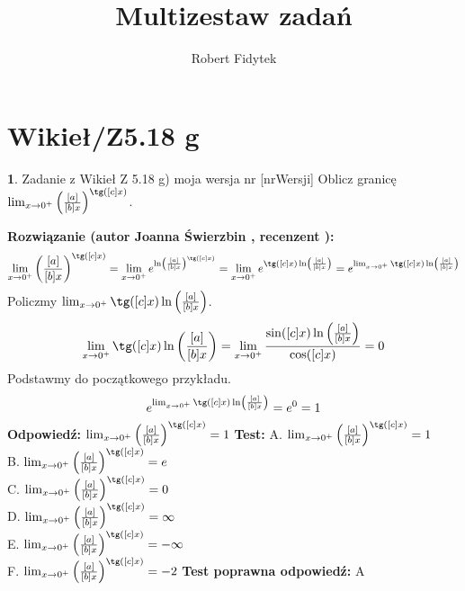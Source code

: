 \documentclass[12pt, a4paper]{article}
\title{Multizestaw zadań}
\author{Robert Fidytek}
\date{}
\theoremstyle{definition} %
\newtheorem{zad}{}
\newcommand{\kategoria}[1]{\section{#1}} %
\newcommand{\zadStart}[1]{\begin{zad}#1\newline} %
\newcommand{\zadStop}{\end{zad}}   %
\newcommand{\rozwStart}[2]{\noindent \textbf{Rozwiązanie (autor #1 , recenzent #2): }\newline} %
\newcommand{\rozwStop}{\newline}                                            %
\newcommand{\odpStart}{\noindent \textbf{Odpowiedź:}\newline}    %
\newcommand{\odpStop}{\newline}                                             %
\newcommand{\testStart}{\noindent \textbf{Test:}\newline} %
\newcommand{\testStop}{\newline} %
\newcommand{\kluczStart}{\noindent \textbf{Test poprawna odpowiedź:}\newline} %
\newcommand{\kluczStop}{\newline} %
\begin{document}
\maketitle


\kategoria{Wikieł/Z5.18 g}
\zadStart{Zadanie z Wikieł Z 5.18 g) moja wersja nr [nrWersji]}
Oblicz granicę $\lim_{x \rightarrow 0^+} \left( \frac{[a]}{[b]x}\right)^{\tg([c]x)}$.
\zadStop
\rozwStart{Joanna Świerzbin}{}
$$ \lim_{x \rightarrow 0^+} \left( \frac{[a]}{[b]x}\right)^{\tg([c]x)} = \lim_{x \rightarrow 0^+} e^{\ln \left( \frac{[a]}{[b]x}\right)^{\tg([c]x)}}
= \lim_{x \rightarrow 0^+} e^{{\tg([c]x)} \ln \left( \frac{[a]}{[b]x}\right)}= e^{ \lim_{x \rightarrow 0^+}{\tg([c]x)} \ln \left( \frac{[a]}{[b]x}\right)}$$
Policzmy ${ \lim_{x \rightarrow 0^+}{\tg([c]x)} \ln \left( \frac{[a]}{[b]x}\right)}$.
$${ \lim_{x \rightarrow 0^+}{\tg([c]x)} \ln \left( \frac{[a]}{[b]x}\right)} = { \lim_{x \rightarrow 0^+}\frac{\sin([c]x) \ln \left( \frac{[a]}{[b]x}\right)}{\cos([c]x)}} = 0$$
Podstawmy do początkowego przykładu.
$$e^{ \lim_{x \rightarrow 0^+}{\tg([c]x)} \ln \left( \frac{[a]}{[b]x}\right)} = e^0 = 1$$
\rozwStop
\odpStart
$\lim_{x \rightarrow 0^+} \left( \frac{[a]}{[b]x}\right)^{\tg([c]x)} = 1$
\odpStop
\testStart
A. $\lim_{x \rightarrow 0^+} \left( \frac{[a]}{[b]x}\right)^{\tg([c]x)} = 1$\\
B. $\lim_{x \rightarrow 0^+} \left( \frac{[a]}{[b]x}\right)^{\tg([c]x)} = e$\\
C. $\lim_{x \rightarrow 0^+} \left( \frac{[a]}{[b]x}\right)^{\tg([c]x)} = 0$\\
D. $\lim_{x \rightarrow 0^+} \left( \frac{[a]}{[b]x}\right)^{\tg([c]x)} = \infty$\\
E. $\lim_{x \rightarrow 0^+} \left( \frac{[a]}{[b]x}\right)^{\tg([c]x)} = -\infty$\\
F. $\lim_{x \rightarrow 0^+} \left( \frac{[a]}{[b]x}\right)^{\tg([c]x)} = -2$
\testStop
\kluczStart
A
\kluczStop
\end{document}
